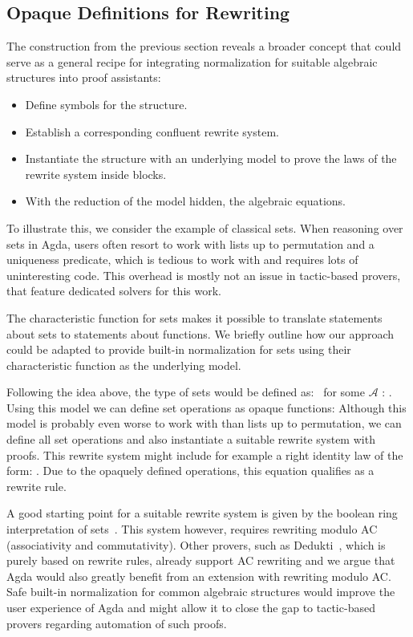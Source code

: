 \documentclass[a4paper,UKenglish,cleveref, autoref, thm-restate,anonymous]{lipics-v2021}
\begin{document}
\subsection{Opaque Definitions for Rewriting}
The construction from the previous section reveals a broader concept that could
serve as a general recipe for integrating normalization for suitable algebraic
structures into proof assistants:

\begin{itemize}
      \item Define symbols for the structure.
      \item Establish a corresponding confluent rewrite system.
      \item Instantiate the structure with an underlying model to prove the laws of the
            rewrite system inside  blocks.
      \item With the reduction of the model hidden,  the algebraic
            equations.
\end{itemize}

To illustrate this, we consider the example of classical sets. When reasoning over
sets in Agda, users often resort to work with lists up to permutation and a
uniqueness predicate, which is tedious to work with and requires lots of
uninteresting code. This overhead is mostly not an issue in tactic-based
provers, that feature dedicated solvers for this work.

The characteristic function for sets makes it possible to translate statements
about sets to statements about functions. We briefly outline how our approach
could be adapted to provide built-in normalization for sets using their
characteristic function as the underlying model.

Following the idea above, the type of sets would be defined as: \ESetProp\, for
some $\mathcal{A}$ :  . Using this model we can
define set operations as opaque functions: \ESetOps{} Although this model is
probably even worse to work with than lists up to permutation, we can define
all set operations and also instantiate a suitable rewrite system with proofs.
This rewrite system might include for example a right identity law of the
form: \ESetLawEx{}. Due to the opaquely defined operations, this equation
qualifies as a rewrite rule.

A good starting point for a suitable rewrite system is given by the boolean
ring interpretation of sets~\cite{HSIANG1985255}. This system however, requires
rewriting modulo AC (associativity and commutativity). Other provers, such as
Dedukti~\cite{assaf2023deduktilogicalframeworkbased}, which is purely based on
rewrite rules, already support AC rewriting and we argue that Agda would also
greatly benefit from an extension with rewriting modulo AC. Safe built-in
normalization for common algebraic structures would improve the user experience
of Agda and might allow it to close the gap to tactic-based provers regarding
automation of such proofs.
\end{document}
